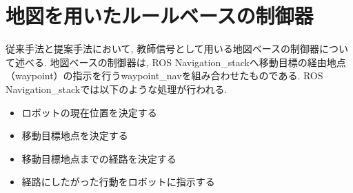 
\section{地図を用いたルールベースの制御器}
従来手法と提案手法において, 教師信号として用いる地図ベースの制御器について述べる. 地図ベースの制御器は, ROS Navigation\_stack\cite{navigation:online}へ移動目標の経由地点（waypoint）の指示を行うwaypoint\_nav\cite{waypoint_nav:online}を組み合わせたものである. ROS Navigation\_stackでは以下のような処理が行われる. 

\begin{itemize}
  \item ロボットの現在位置を決定する
  \item 移動目標地点を決定する
  \item 移動目標地点までの経路を決定する
  \item 経路にしたがった行動をロボットに指示する
\end{itemize}





\newpage